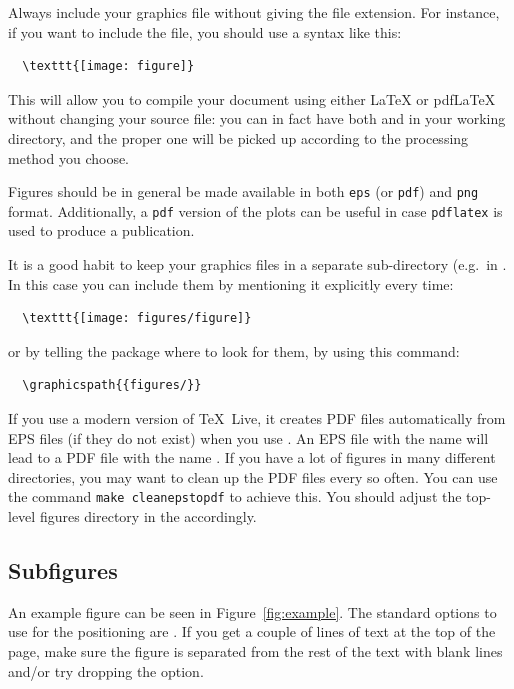 Always include your graphics file without giving the file extension.
For instance, if you want to include the 
file, you should use a syntax like this:
\begin{verbatim}
  \texttt{[image: figure]}
\end{verbatim}
This will allow you to compile your document using either \LaTeX{} or
pdf\LaTeX{} without changing your source file: you can in fact have
both  and  in your working directory,
and the proper one will be picked up according to the processing method
you choose.

Figures should be in general be made available in both \texttt{eps} (or \texttt{pdf}) and 
\texttt{png} format. Additionally, a \texttt{pdf} version of the plots can be
useful in case \verb|pdflatex| is used to produce a publication.

It is a good habit to keep your graphics files in a separate
sub-directory (e.g.\ in . 
In this case you can include them by mentioning it explicitly every time:
\begin{verbatim}
  \texttt{[image: figures/figure]}
\end{verbatim}
or by telling the  package where to look
for them, by using this command:
\begin{verbatim}
  \graphicspath{{figures/}}
\end{verbatim}

If you use a modern version of \TeX\ Live, it creates PDF files automatically from EPS files
(if they do not exist) when you use .
An EPS file with the name  will lead to a PDF file with the name
.
If you have a lot of figures in many different directories, you may want to clean up the PDF files every so often.
You can use the command \verb|make cleanepstopdf| to achieve this.
You should adjust the top-level figures directory in the  accordingly.


\subsection{Subfigures}

An example figure can be seen in Figure~\ref{fig:example}.
The standard options to use for the positioning are .
If you get a couple of lines of text at the top of the page,
make sure the figure is separated from the rest of the text with blank lines and/or try dropping the  option.

